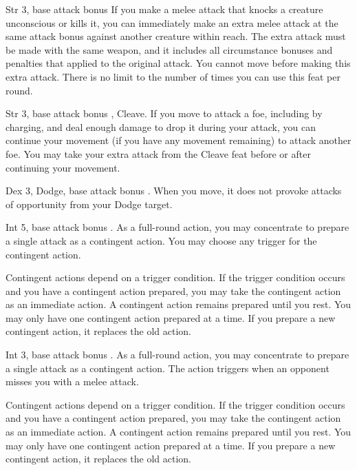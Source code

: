  Str 3, base attack bonus 
 If you make a melee attack that knocks a creature unconscious or kills it, you can immediately make an extra melee attack at the same attack bonus against another creature within reach. The extra attack must be made with the same weapon, and it includes all circumstance bonuses and penalties that applied to the original attack. You cannot move before making this extra attack. There is no limit to the number of times you can use this feat per round.

 Str 3, base attack bonus , Cleave.
 If you move to attack a foe, including by charging, and deal enough damage to drop it during your attack, you can continue your movement (if you have any movement remaining) to attack another foe. You may take your extra attack from the Cleave feat before or after continuing your movement.

 Dex 3, Dodge, base attack bonus .
 When you move, it does not provoke attacks of opportunity from your Dodge target.

\featpre Int 5, base attack bonus .
\featben As a full-round action, you may concentrate to prepare a single attack as a contingent action. You may choose any trigger for the contingent action.

Contingent actions depend on a trigger condition. If the trigger condition occurs and you have a contingent action prepared, you may take the contingent action as an immediate action. A contingent action remains prepared until you rest. You may only have one contingent action prepared at a time. If you prepare a new contingent action, it replaces the old action.

\featpre Int 3, base attack bonus .
\featben As a full-round action, you may concentrate to prepare a single attack as a contingent action. The action triggers when an opponent misses you with a melee attack.

Contingent actions depend on a trigger condition. If the trigger condition occurs and you have a contingent action prepared, you may take the contingent action as an immediate action. A contingent action remains prepared until you rest. You may only have one contingent action prepared at a time. If you prepare a new contingent action, it replaces the old action.

